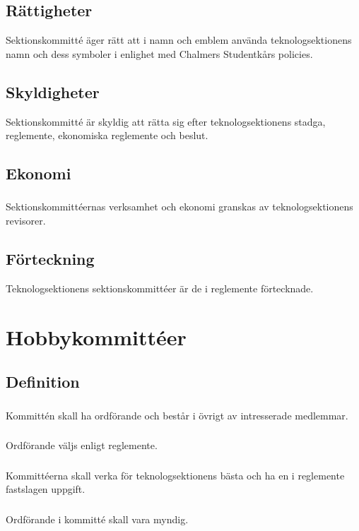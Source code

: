 \documentclass[a4paper]{dtek}
\begin{document}
\subsection{Rättigheter}
Sektionskommitté äger rätt att i namn och emblem använda teknologsektionens namn och dess symboler i enlighet med Chalmers Studentkårs policies.
\subsection{Skyldigheter}
Sektionskommitté är skyldig att rätta sig efter teknologsektionens stadga, reglemente, ekonomiska reglemente och beslut.
\subsection{Ekonomi}
\subsubsection{}
Sektionskommittéernas verksamhet och ekonomi granskas av teknologsektionens revisorer.
\subsection{Förteckning}
Teknologsektionens sektionskommittéer är de i reglemente förtecknade.
\newpage

\section{Hobbykommittéer}
\subsection{Definition}
\subsubsection{}
Kommittén skall ha ordförande och består i övrigt av intresserade medlemmar.
\subsubsection{}
Ordförande väljs enligt reglemente.
\subsubsection{}
Kommittéerna skall verka för teknologsektionens bästa och ha en i reglemente fastslagen uppgift.
\subsubsection{}
Ordförande i kommitté skall vara myndig.
\end{document}
